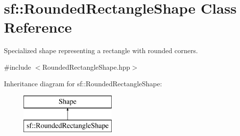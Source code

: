 \hypertarget{classsf_1_1_rounded_rectangle_shape}{}\section{sf\+::Rounded\+Rectangle\+Shape Class Reference}
\label{classsf_1_1_rounded_rectangle_shape}


Specialized shape representing a rectangle with rounded corners.  




{\ttfamily \#include $<$Rounded\+Rectangle\+Shape.\+hpp$>$}

Inheritance diagram for sf\+::Rounded\+Rectangle\+Shape\+:\begin{figure}[H]
\begin{center}
\leavevmode
\includegraphics[height=2.000000cm]{classsf_1_1_rounded_rectangle_shape}
\end{center}
\end{figure}
